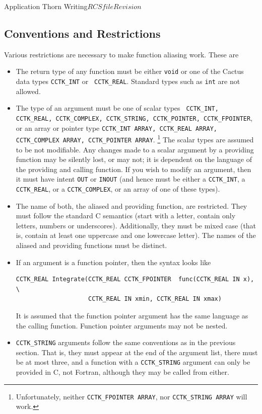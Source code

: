 \begin{cactuspart}{Application Thorn Writing}{$RCSfile$}{$Revision$}
\subsection{Conventions and Restrictions}

Various restrictions are necessary to make function aliasing
work. These are
\begin{itemize}
\item The return type of any function must be either \texttt{void} or one
  of the Cactus data types \texttt{CCTK\_INT} or {\tt
    CCTK\_REAL}. Standard types such as \texttt{int} are not allowed.
\item The type of an argument must be one of scalar types {\tt
    CCTK\_INT, CCTK\_REAL, CCTK\_COMPLEX, CCTK\_STRING, CCTK\_POINTER,
    CCTK\_FPOINTER}, or an array or pointer type \texttt{CCTK\_INT ARRAY,
    CCTK\_REAL ARRAY, CCTK\_COMPLEX ARRAY, \texttt{CCTK\_POINTER ARRAY}}.%
\footnote{%
         Unfortunately, neither \texttt{CCTK\_FPOINTER ARRAY},
         nor \texttt{CCTK\_STRING ARRAY} will work.
         }%
  {}  The scalar types are assumed to be not
  modifiable. Any changes made to a scalar argument by a providing
  function may be silently lost, or may not; it is dependent on the
  language of the providing and calling function. If you wish to
  modify an argument, then it must have intent \texttt{OUT} or \texttt{INOUT}
  (and hence must be either a \texttt{CCTK\_INT}, a
  \texttt{CCTK\_REAL}, or a \texttt{CCTK\_COMPLEX},
  or an array of one of these types).
\item The name of both, the aliased and providing function, are
  restricted. They must follow the standard C semantics (start with a
  letter, contain only letters, numbers or underscores). Additionally,
  they must be mixed case (that is, contain at least one uppercase and
  one lowercase letter). The names of the aliased and providing
  functions must be distinct.
\item If an argument is a function pointer, then the syntax looks like
\begin{verbatim}
CCTK_REAL Integrate(CCTK_REAL CCTK_FPOINTER  func(CCTK_REAL IN x), \
                    CCTK_REAL IN xmin, CCTK_REAL IN xmax)
\end{verbatim}
  It is assumed that the function pointer argument has the same
  language as the calling function. Function pointer arguments may not
  be nested.
\item \texttt{CCTK\_STRING} arguments follow the same conventions as in
  the previous section. That is, they must appear at the end of the
  argument list, there must be at most three, and a function with a
  \texttt{CCTK\_STRING} argument can only be provided in C, not Fortran,
  although they may be called from either.
\end{itemize}



\end{cactuspart}
